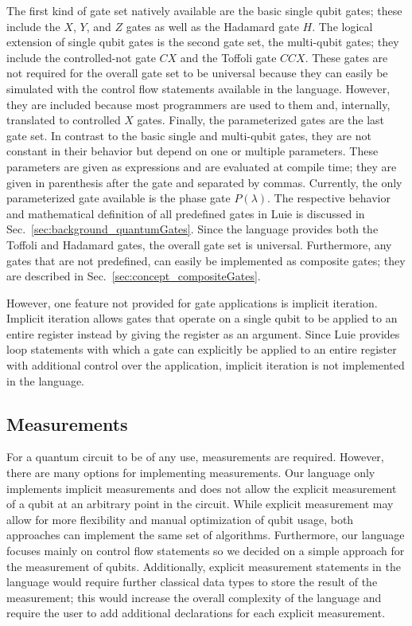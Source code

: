 The first kind of gate set natively available are the basic single qubit gates; these include the $X$, $Y$, and $Z$ gates as well as the Hadamard gate $H$. The logical extension of single qubit gates is the second gate set, the multi-qubit gates; they include the controlled-not gate $CX$ and the Toffoli gate $CCX$. These gates are not required for the overall gate set to be universal because they can easily be simulated with the control flow statements available in the language. However, they are included because most programmers are used to them and, internally, translated to controlled $X$ gates.
Finally, the parameterized gates are the last gate set. In contrast to the basic single and multi-qubit gates, they are not constant in their behavior but depend on one or multiple parameters. These parameters are given as expressions and are evaluated at compile time; they are given in parenthesis after the gate and separated by commas. Currently, the only parameterized gate available is the phase gate $P(\lambda)$.
The respective behavior and mathematical definition of all predefined gates in Luie is discussed in Sec.~\ref{sec:background_quantumGates}. Since the language provides both the Toffoli and Hadamard gates, the overall gate set is universal. Furthermore, any gates that are not predefined, can easily be implemented as composite gates; they are described in Sec.~\ref{sec:concept_compositeGates}.

However, one feature not provided for gate applications is implicit iteration. Implicit iteration allows gates that operate on a single qubit to be applied to an entire register instead by giving the register as an argument. Since Luie provides loop statements with which a gate can explicitly be applied to an entire register with additional control over the application, implicit iteration is not implemented in the language.  

\subsection{Measurements}
\label{sec:concept_measurement}
For a quantum circuit to be of any use, measurements are required. However, there are many options for implementing measurements. Our language only implements implicit measurements and does not allow the explicit measurement of a qubit at an arbitrary point in the circuit. While explicit measurement may allow for more flexibility and manual optimization of qubit usage, both approaches can implement the same set of algorithms. Furthermore, our language focuses mainly on control flow statements so we decided on a simple approach for the measurement of qubits. Additionally, explicit measurement statements in the language would require further classical data types to store the result of the measurement; this would increase the overall complexity of the language and require the user to add additional declarations for each explicit measurement.

